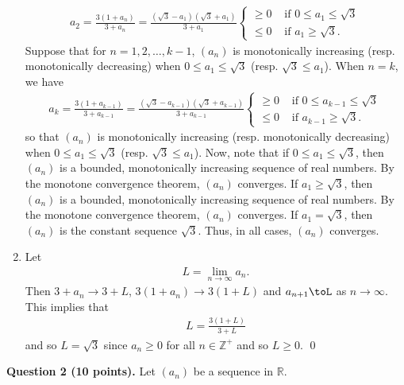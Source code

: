 \documentclass[11pt]{amsart}
\theoremstyle{plain}
\numberwithin{equation}{section}
\begin{document}
\begin{enumerate}[label=\textbf{(\roman*)}]
\begin{align*}
    a_{2}=\frac{3\left(1+a_{n}\right)}{3+a_{n}}=\frac{\left(\sqrt{3}-a_{1}\right)\left(\sqrt{3}+a_{1}\right)}{3+a_{1}}\begin{cases}
        \geq 0&\text{ if }0\leq a_{1}\leq\sqrt{3}
        \\
        \leq 0&\text{ if }a_{1}\geq\sqrt{3}.
    \end{cases}
\end{align*}
Suppose that for $n=1,2,\dots,k-1$, $\left(a_{n}\right)$ is monotonically increasing (resp. monotonically decreasing) when $0\leq a_{1}\leq\sqrt{3}$ (resp. $\sqrt{3}\leq a_{1}$). When $n=k$, we have
\begin{align*}
    a_{k}=\frac{3\left(1+a_{k-1}\right)}{3+a_{k-1}}=\frac{\left(\sqrt{3}-a_{k-1}\right)\left(\sqrt{3}+a_{k-1}\right)}{3+a_{k-1}}\begin{cases}
        \geq 0&\text{ if }0\leq a_{k-1}\leq\sqrt{3}
        \\
        \leq 0&\text{ if }a_{k-1}\geq\sqrt{3}.
    \end{cases}
\end{align*}
so that $\left(a_{n}\right)$ is monotonically increasing (resp. monotonically decreasing) when $0\leq a_{1}\leq\sqrt{3}$ (resp. $\sqrt{3}\leq a_{1}$).
\newline
\newline Now, note that if $0\leq a_{1}\leq\sqrt{3}$, then $\left(a_{n}\right)$ is a bounded, monotonically increasing sequence of real numbers. By the monotone convergence theorem, $\left(a_{n}\right)$ converges. If $a_{1}\geq\sqrt{3}$, then $\left(a_{n}\right)$ is a bounded, monotonically increasing sequence of real numbers. By the monotone convergence theorem, $\left(a_{n}\right)$ converges. If $a_{1}=\sqrt{3}$, then $\left(a_{n}\right)$ is the constant sequence $\sqrt{3}$. Thus, in all cases, $\left(a_{n}\right)$ converges.
\item Let 
\begin{align*}
    L=\lim_{n\to\infty}a_{n}.
\end{align*}
Then $3+a_{n}\to 3+L$, $3\left(1+a_{n}\right)\to3\left(1+L\right)$ and $a_{n+1}\toL$ as $n\to\infty$. This implies that 
\begin{align*}
    L=\frac{3\left(1+L\right)}{3+L}
\end{align*}
and so $L=\sqrt{3}$ since $a_{n}\geq 0$ for all $n\in\mathbb{Z}^{+}$ and so $L\geq 0$. \qed 
\end{enumerate}
\textbf{Question 2 (10 points).} Let $\left(a_n\right)$ be a sequence in $\mathbb{R}$. 
\end{document}
